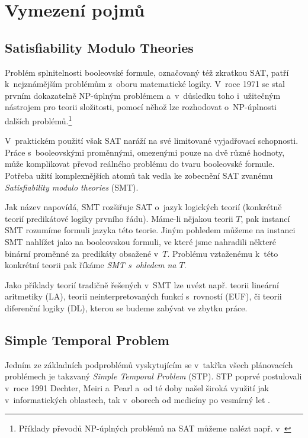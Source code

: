 \chapter{Vymezení pojmů}

\section{Satisfiability Modulo Theories}

Problém splnitelnosti booleovské formule, označovaný též zkratkou SAT, patří k~nejznámějším problémům z~oboru matematické logiky. V~roce 1971 se stal prvním dokazatelně NP-úplným problémem \cite{Cook71} a~v~důsledku toho i~užitečným nástrojem pro teorii složitosti, pomocí něhož lze rozhodovat o~NP-úplnosti dalších problémů.\footnote{Příklady převodů NP-úplných problémů na SAT můžeme nalézt např. v~\cite[kapitola 19]{Mares17}}

V~praktickém použití však SAT naráží na své limitované vyjadřovací schopnosti. Práce s~booleovskými proměnnými, omezenými pouze na dvě různé hodnoty, může komplikovat převod reálného problému do tvaru booleovské formule. Potřeba užití komplexnějších atomů tak vedla ke zobecnění SAT zvanému \emph{Satisfiability modulo theories} (SMT).

Jak název napovídá, SMT rozšiřuje SAT o~jazyk logických teorií (konkrétně teorií predikátové logiky prvního řádu). Máme-li nějakou teorii $T$, pak instancí SMT rozumíme formuli jazyka této teorie. Jiným pohledem můžeme na instanci SMT nahlížet jako na booleovskou formuli, ve které jsme nahradili některé binární proměnné za predikáty obsažené v~$T$. Problému vztaženému k~této konkrétní teorii pak říkáme \emph{SMT s~ohledem na $T$}.

Jako příklady teorií tradičně řešených v~SMT lze uvézt např. teorii lineární aritmetiky (LA), teorii neinterpretovaných funkcí s~rovností (EUF), či teorii diferenční logiky (DL), kterou se budeme zabývat ve zbytku práce.

\section{Simple Temporal Problem}\label{stp}

Jedním ze základních podproblémů vyskytujícím se v~takřka všech plánovacích problémech je takzvaný \emph{Simple Temporal Problem} (STP). STP poprvé postulovali v~roce 1991 Dechter, Meiri a~Pearl \cite{Dechter91} a~od té doby našel široká využití jak v~informatických oblastech, tak v~oborech od medicíny \cite{Anselma06} po vesmírný let \cite{Fukunaga97}.

